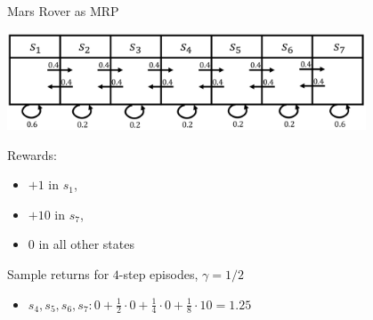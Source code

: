\documentclass[aspectratio=169]{../latex_main/tntbeamer}  %
\begin{document}
\begin{frame}[c]{Mars Rover as MRP}
	
	\begin{center}
		\includegraphics[width=0.8\textwidth]{images/mars_rover_markov_process_2.png}
	\end{center}
	
	Rewards:
	\begin{itemize}
		\item $+1$ in $s_1$, 
		\item $+10$ in $s_7$,
		\item $0$ in all other states
	\end{itemize}
	
	Sample returns for $4$-step episodes, $\gamma=1/2$
	\begin{itemize}
		\item $s_4,s_5,s_6,s_7: 0 + \frac{1}{2}\cdot 0 + \frac{1}{4}\cdot 0 + \frac{1}{8}\cdot 10 = 1.25$
	\end{itemize}
	
\end{frame}
\end{document}

